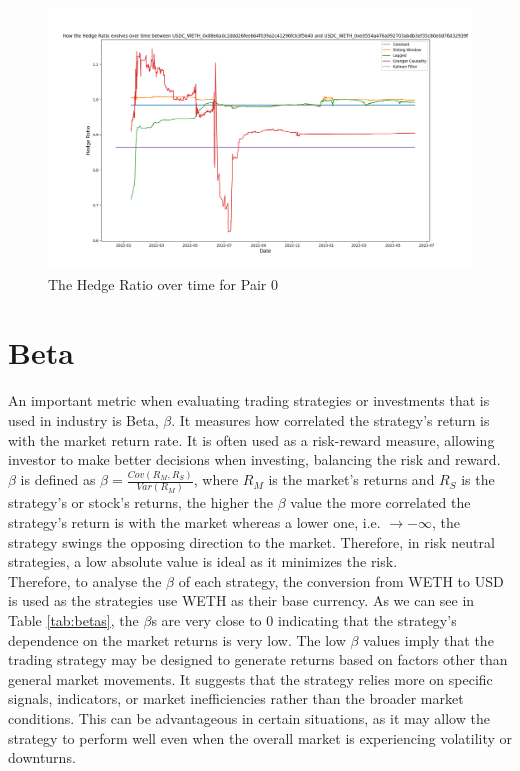 \begin{figure}[H]
    \centering
    \includegraphics[width=\linewidth]{evaluation/Images/HedgeRatioPerStrat.png}
    \caption{The Hedge Ratio over time for Pair 0}
    \label{fig:HedgeRatioPerStrat}
\end{figure}


\section{Beta}
An important metric when evaluating trading strategies or investments that is used in industry is Beta, $\beta$. It measures how correlated the strategy's return is with the market return rate. It is often used as a risk-reward measure, allowing investor to make better decisions when investing, balancing the risk and reward. $\beta$ is defined as $\beta = \frac{Cov(R_M, R_S)}{Var(R_M)}$, where $R_M$ is the market's returns and $R_S$ is the strategy's or stock's returns, the higher the $\beta$ value the more correlated the strategy's return is with the market whereas a lower one, i.e. $\rightarrow - \infty$, the strategy swings the opposing direction to the market. Therefore, in risk neutral strategies, a low absolute value is ideal as it minimizes the risk.
\\[5mm]
Therefore, to analyse the $\beta$ of each strategy, the conversion from WETH to USD is used as the strategies use WETH as their base currency. As we can see in Table \ref{tab:betas}, the $\beta$s are very close to 0 indicating that the strategy's dependence on the market returns is very low. The low $\beta$ values imply that the trading strategy may be designed to generate returns based on factors other than general market movements. It suggests that the strategy relies more on specific signals, indicators, or market inefficiencies rather than the broader market conditions. This can be advantageous in certain situations, as it may allow the strategy to perform well even when the overall market is experiencing volatility or downturns.


